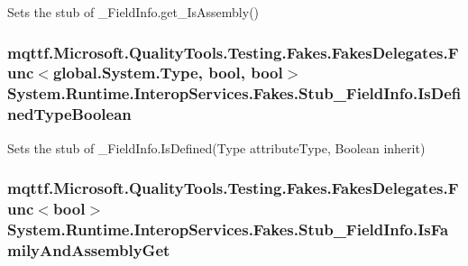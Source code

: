 Sets the stub of \-\_\-\-Field\-Info.\-get\-\_\-\-Is\-Assembly()

\hypertarget{class_system_1_1_runtime_1_1_interop_services_1_1_fakes_1_1_stub___field_info_a8e2b9c39392b55c822ea167ec1fcb003}{
\subsubsection[{Is\-Defined\-Type\-Boolean}]{\setlength{\rightskip}{0pt plus 5cm}mqttf.\-Microsoft.\-Quality\-Tools.\-Testing.\-Fakes.\-Fakes\-Delegates.\-Func$<$global.\-System.\-Type, bool, bool$>$ System.\-Runtime.\-Interop\-Services.\-Fakes.\-Stub\-\_\-\-Field\-Info.\-Is\-Defined\-Type\-Boolean}}\label{class_system_1_1_runtime_1_1_interop_services_1_1_fakes_1_1_stub___field_info_a8e2b9c39392b55c822ea167ec1fcb003}


Sets the stub of \-\_\-\-Field\-Info.\-Is\-Defined(\-Type attribute\-Type, Boolean inherit)

\hypertarget{class_system_1_1_runtime_1_1_interop_services_1_1_fakes_1_1_stub___field_info_a5944538870f557d388c0bb791b5a5397}{
\subsubsection[{Is\-Family\-And\-Assembly\-Get}]{\setlength{\rightskip}{0pt plus 5cm}mqttf.\-Microsoft.\-Quality\-Tools.\-Testing.\-Fakes.\-Fakes\-Delegates.\-Func$<$bool$>$ System.\-Runtime.\-Interop\-Services.\-Fakes.\-Stub\-\_\-\-Field\-Info.\-Is\-Family\-And\-Assembly\-Get}}\label{class_system_1_1_runtime_1_1_interop_services_1_1_fakes_1_1_stub___field_info_a5944538870f557d388c0bb791b5a5397}


